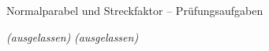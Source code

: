 \setcounter{aufgabe}{2}

\begin{aufgabe}{Normalparabel und Streckfaktor – Prüfungsaufgaben}
\begin{teile}
\teil \textit{(ausgelassen)}
\teil \textit{(ausgelassen)}
\end{teile}
\end{aufgabe}
